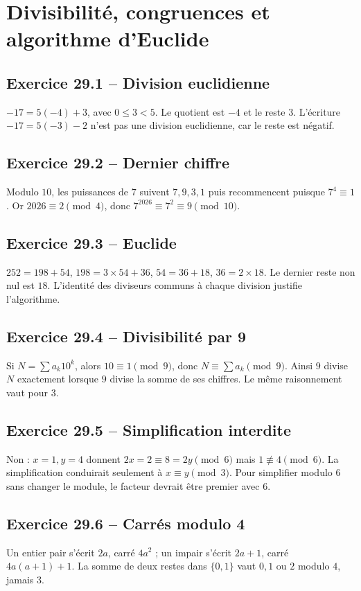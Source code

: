\chapter{Divisibilité, congruences et algorithme d’Euclide}
\section*{Exercice 29.1 -- Division euclidienne}
$-17=5(-4)+3$, avec $0\le3<5$. Le quotient est $-4$ et le reste $3$. L'écriture $-17=5(-3)-2$ n'est pas une division euclidienne, car le reste est négatif.

\section*{Exercice 29.2 -- Dernier chiffre}
Modulo $10$, les puissances de $7$ suivent $7,9,3,1$ puis recommencent puisque $7^4\equiv1$. Or $2026\equiv2\pmod4$, donc $7^{2026}\equiv7^2\equiv9\pmod{10}$.

\section*{Exercice 29.3 -- Euclide}
$252=198+54$, $198=3\times54+36$, $54=36+18$, $36=2\times18$. Le dernier reste non nul est $18$. L'identité des diviseurs communs à chaque division justifie l'algorithme.

\section*{Exercice 29.4 -- Divisibilité par 9}
Si $N=\sum a_k10^k$, alors $10\equiv1\pmod9$, donc $N\equiv\sum a_k\pmod9$. Ainsi $9$ divise $N$ exactement lorsque $9$ divise la somme de ses chiffres. Le même raisonnement vaut pour $3$.

\section*{Exercice 29.5 -- Simplification interdite}
Non : $x=1,y=4$ donnent $2x=2\equiv8=2y\pmod6$ mais $1\not\equiv4\pmod6$. La simplification conduirait seulement à $x\equiv y\pmod3$. Pour simplifier modulo $6$ sans changer le module, le facteur devrait être premier avec $6$.

\section*{Exercice 29.6 -- Carrés modulo 4}
Un entier pair s'écrit $2a$, carré $4a^2$ ; un impair s'écrit $2a+1$, carré $4a(a+1)+1$. La somme de deux restes dans $\{0,1\}$ vaut $0,1$ ou $2$ modulo $4$, jamais $3$.
